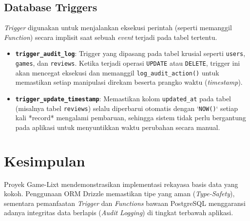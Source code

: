 \documentclass[12pt,a4paper]{article}
\begin{document}
\subsection{Database Triggers}
\textit{Trigger} digunakan untuk menjalankan eksekusi perintah (seperti memanggil \textit{Function}) secara implisit saat sebuah \textit{event} terjadi pada tabel tertentu.
\begin{itemize}
    \item \textbf{\texttt{trigger\_audit\_log}}: Trigger yang dipasang pada tabel krusial seperti \texttt{users}, \texttt{games}, dan \texttt{reviews}. Ketika terjadi operasi \texttt{UPDATE} atau \texttt{DELETE}, trigger ini akan mencegat eksekusi dan memanggil \texttt{log\_audit\_action()} untuk memastikan setiap manipulasi direkam beserta prangko waktu (\textit{timestamp}).
    \item \textbf{\texttt{trigger\_update\_timestamp}}: Memastikan kolom \texttt{updated\_at} pada tabel (misalnya tabel \texttt{reviews}) selalu diperbarui otomatis dengan `\texttt{NOW()}` setiap kali *record* mengalami pembaruan, sehingga sistem tidak perlu bergantung pada aplikasi untuk menyuntikkan waktu perubahan secara manual.
\end{itemize}

\section{Kesimpulan}
Proyek Game-Lixt mendemonstrasikan implementasi rekayasa basis data yang kokoh. Penggunaan ORM Drizzle memastikan tipe yang aman (\textit{Type-Safety}), sementara pemanfaatan \textit{Trigger} dan \textit{Functions} bawaan PostgreSQL menggaransi adanya integritas data berlapis (\textit{Audit Logging}) di tingkat terbawah aplikasi.
\end{document}
